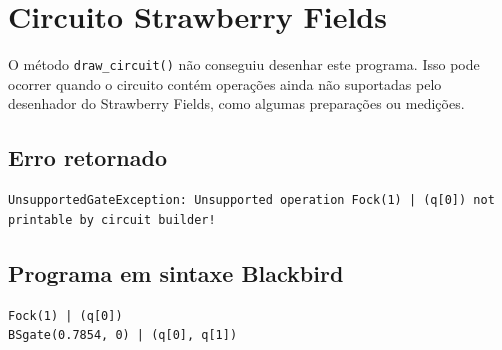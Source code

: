 \documentclass{article}
\begin{document}
\section*{Circuito Strawberry Fields}

O método \texttt{draw\_circuit()} não conseguiu desenhar este programa. Isso pode ocorrer quando o circuito contém operações ainda não suportadas pelo desenhador do Strawberry Fields, como algumas preparações ou medições.

\subsection*{Erro retornado}
\begin{verbatim}
UnsupportedGateException: Unsupported operation Fock(1) | (q[0]) not printable by circuit builder!
\end{verbatim}

\subsection*{Programa em sintaxe Blackbird}
\begin{verbatim}
Fock(1) | (q[0])
BSgate(0.7854, 0) | (q[0], q[1])
\end{verbatim}
\end{document}
